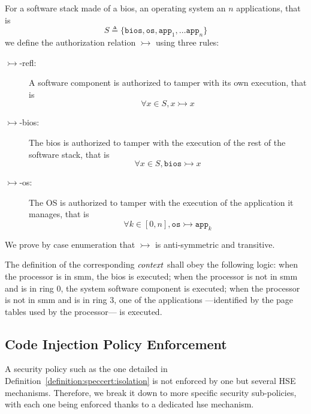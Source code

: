 \begin{definition}
  \label{definition:speccert:isolation}

  For a software stack made of a \ac{bios}, an operating system an \( n \)
  applications, that is
  \[
    S \triangleq \{ \mathtt{bios}, \mathtt{os}, \mathtt{app}_1, \dots
    \mathtt{app}_n \}
  \]
  we define the authorization relation $\rightarrowtail$ using three rules:
  \begin{description}
  \item [\(\rightarrowtail\)-refl:] A software component is authorized to tamper
    with its own execution, that is
    \[ \forall x \in S, x \rightarrowtail x \]
  \item [\(\rightarrowtail\)-bios:] The \ac{bios} is authorized to tamper with
    the execution of the rest of the software stack, that is
    \[ \forall x \in S, \mathtt{bios} \rightarrowtail x \]
  \item [\(\rightarrowtail\)-os:] The OS is authorized to tamper with the
    execution of the application it manages, that is
    \[ \forall k \in [0, n], \mathtt{os} \rightarrowtail \mathtt{app}_k \]
  \end{description}

  We prove by case enumeration that $\rightarrowtail$ is anti-symmetric and
  transitive.

  The definition of the corresponding $\mathit{context}$ shall obey the following
  logic: when the processor is in \ac{smm}, the \ac{bios} is executed; when the
  processor is not in \ac{smm} and is in ring 0, the system software component 
  is executed; when the processor is not in \ac{smm} and is in ring 3, one of
  the applications ---identified by the page tables used by the processor--- is
  executed.
\end{definition}

\subsection{Code Injection Policy Enforcement}
\label{subsec:speccert:isolationenforcement}

A security policy such as the one detailed in
Definition~\ref{definition:speccert:isolation} is not enforced by one but
several HSE mechanisms.
%
Therefore, we break it down to more specific security sub-policies, with each
one being enforced thanks to a dedicated \ac{hse} mechanism.

